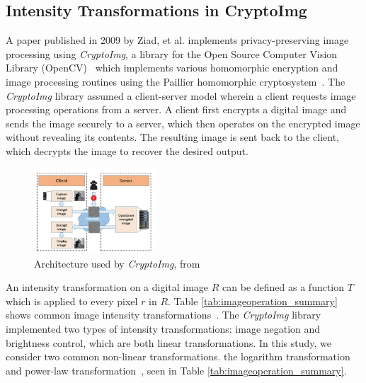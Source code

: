 \subsection{Intensity Transformations in CryptoImg}
A paper published in 2009 by Ziad, et al. implements privacy-preserving image processing using \textit{CryptoImg}, a library for the Open Source Computer Vision Library (OpenCV)~\cite{bradski_opencv_2000} which implements various homomorphic encryption and image processing routines using the Paillier homomorphic cryptosystem~\cite{ziad_cryptoimg:_2016}. The \textit{CryptoImg} library assumed a client-server model wherein a client requests image processing operations from a server. A client first encrypts a digital image and sends the image securely to a server, which then operates on the encrypted image without revealing its contents. The resulting image is sent back to the client, which decrypts the image to recover the desired output.
\begin{figure}[!ht]
    \centering
    \includegraphics[width=0.4\textwidth]{figures/ClientServerModel.png}
    \caption{Architecture used by \textit{CryptoImg}, from \cite{ziad_cryptoimg:_2016}}
    \label{fig:clientserver}
\end{figure}

An intensity transformation on a digital image $R$ can be defined as a function $T$ which is applied to every pixel $r$ in $R$. Table \ref{tab:imageoperation_summary} shows common image intensity transformations~\cite{gonzalez_digital_2008}. 
The \textit{CryptoImg} library implemented two types of intensity transformations: image negation and brightness control, which are both linear transformations. 
In this study, we consider two common non-linear transformations. the logarithm transformation and power-law transformation~\cite{gonzalez_digital_2008}, seen in Table \ref{tab:imageoperation_summary}.



